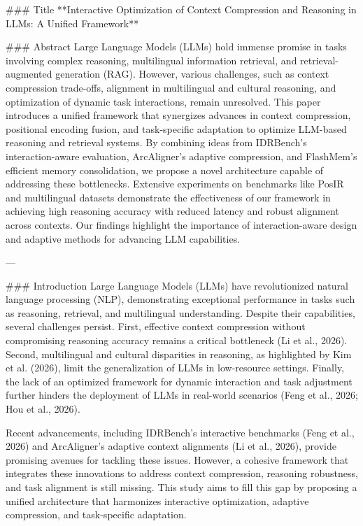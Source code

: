 ### Title
**Interactive Optimization of Context Compression and Reasoning in LLMs: A Unified Framework**

### Abstract
Large Language Models (LLMs) hold immense promise in tasks involving complex reasoning, multilingual information retrieval, and retrieval-augmented generation (RAG). However, various challenges, such as context compression trade-offs, alignment in multilingual and cultural reasoning, and optimization of dynamic task interactions, remain unresolved. This paper introduces a unified framework that synergizes advances in context compression, positional encoding fusion, and task-specific adaptation to optimize LLM-based reasoning and retrieval systems. By combining ideas from IDRBench's interaction-aware evaluation, ArcAligner's adaptive compression, and FlashMem's efficient memory consolidation, we propose a novel architecture capable of addressing these bottlenecks. Extensive experiments on benchmarks like PosIR and multilingual datasets demonstrate the effectiveness of our framework in achieving high reasoning accuracy with reduced latency and robust alignment across contexts. Our findings highlight the importance of interaction-aware design and adaptive methods for advancing LLM capabilities.

---

### Introduction
Large Language Models (LLMs) have revolutionized natural language processing (NLP), demonstrating exceptional performance in tasks such as reasoning, retrieval, and multilingual understanding. Despite their capabilities, several challenges persist. First, effective context compression without compromising reasoning accuracy remains a critical bottleneck (Li et al., 2026). Second, multilingual and cultural disparities in reasoning, as highlighted by Kim et al. (2026), limit the generalization of LLMs in low-resource settings. Finally, the lack of an optimized framework for dynamic interaction and task adjustment further hinders the deployment of LLMs in real-world scenarios (Feng et al., 2026; Hou et al., 2026).

Recent advancements, including IDRBench's interactive benchmarks (Feng et al., 2026) and ArcAligner's adaptive context alignments (Li et al., 2026), provide promising avenues for tackling these issues. However, a cohesive framework that integrates these innovations to address context compression, reasoning robustness, and task alignment is still missing. This study aims to fill this gap by proposing a unified architecture that harmonizes interactive optimization, adaptive compression, and task-specific adaptation.

